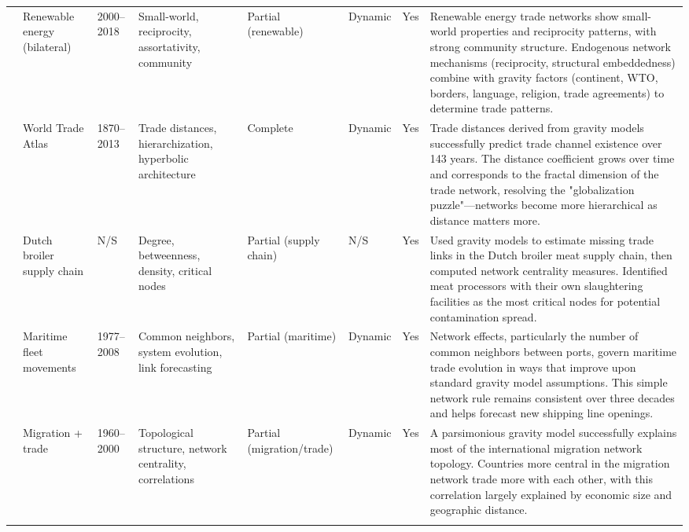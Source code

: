 \documentclass[preprint, 3p,
authoryear]{elsarticle} %
\begin{document}
\begin{landscape}
\begin{longtable}{p{2.2cm}p{2cm}p{1.5cm}p{3.0cm}p{1.8cm}p{1.2cm}p{1.2cm}p{8cm}}
\cite{feng2024patterns} &Renewable energy (bilateral) & 2000–2018 & Small-world, reciprocity, assortativity, community & Partial (renewable) & Dynamic & Yes & Renewable energy trade networks show small-world properties and reciprocity patterns, with strong community structure. Endogenous network mechanisms (reciprocity, structural embeddedness) combine with gravity factors (continent, WTO, borders, language, religion, trade agreements) to determine trade patterns. \\
\addlinespace

\cite{garcia2016international} & World Trade Atlas & 1870–2013 & Trade distances, hierarchization, hyperbolic architecture & Complete & Dynamic & Yes & Trade distances derived from gravity models successfully predict trade channel existence over 143 years. The distance coefficient grows over time and corresponds to the fractal dimension of the trade network, resolving the "globalization puzzle"—networks become more hierarchical as distance matters more. \\
\addlinespace

\cite{hao2020using} & Dutch broiler supply chain & N/S & Degree, betweenness, density, critical nodes & Partial (supply chain) & N/S & Yes & Used gravity models to estimate missing trade links in the Dutch broiler meat supply chain, then computed network centrality measures. Identified meat processors with their own slaughtering facilities as the most critical nodes for potential contamination spread. \\
\addlinespace

\cite{kosowska2020network} & Maritime fleet movements & 1977–2008 & Common neighbors, system evolution, link forecasting & Partial (maritime) & Dynamic & Yes & Network effects, particularly the number of common neighbors between ports, govern maritime trade evolution in ways that improve upon standard gravity model assumptions. This simple network rule remains consistent over three decades and helps forecast new shipping line openings. \\
\addlinespace

\cite{fagiolo2009} & Migration + trade & 1960–2000 & Topological structure, network centrality, correlations & Partial (migration/trade) & Dynamic & Yes & A parsimonious gravity model successfully explains most of the international migration network topology. Countries more central in the migration network trade more with each other, with this correlation largely explained by economic size and geographic distance.  \\
\addlinespace


\end{longtable}
\end{landscape}
\end{document}
